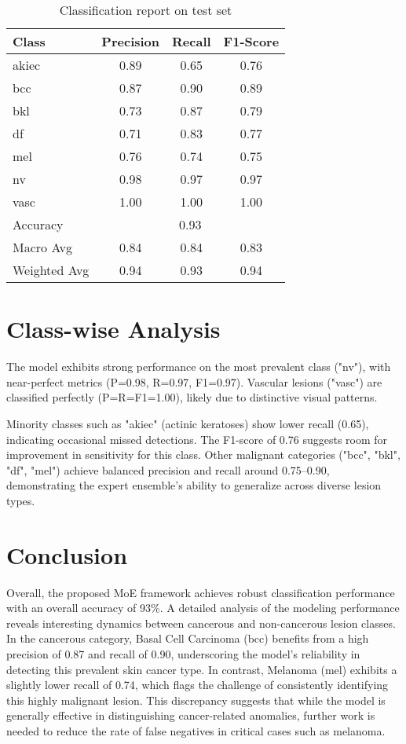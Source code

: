\begin{table}[h!]
  \centering
  \caption{Classification report on test set}
  \label{tab:classification-report}
  \begin{tabular}{lccc}
    \hline
    Class & Precision & Recall & F1-Score \\
    \hline
    akiec  & 0.89 & 0.65 & 0.76 \\
    bcc    & 0.87 & 0.90 & 0.89 \\
    bkl    & 0.73 & 0.87 & 0.79 \\
    df     & 0.71 & 0.83 & 0.77 \\
    mel    & 0.76 & 0.74 & 0.75 \\
    nv     & 0.98 & 0.97 & 0.97 \\
    vasc   & 1.00 & 1.00 & 1.00 \\
    \hline
    Accuracy      & \multicolumn{3}{c}{0.93} \\
    Macro Avg     & 0.84 & 0.84 & 0.83 \\
    Weighted Avg  & 0.94 & 0.93 & 0.94 \\
    \hline
  \end{tabular}
\end{table}



\section{Class-wise Analysis}
The model exhibits strong performance on the most prevalent class ("nv"), with near-perfect metrics (P=0.98, R=0.97, F1=0.97). Vascular lesions ("vasc") are classified perfectly (P=R=F1=1.00), likely due to distinctive visual patterns.

Minority classes such as "akiec" (actinic keratoses) show lower recall (0.65), indicating occasional missed detections. The F1-score of 0.76 suggests room for improvement in sensitivity for this class. Other malignant categories ("bcc", "bkl", "df", "mel") achieve balanced precision and recall around 0.75--0.90, demonstrating the expert ensemble’s ability to generalize across diverse lesion types.
\section{Conclusion}
Overall, the proposed MoE framework achieves robust classification performance with an overall accuracy of 93\%. A detailed analysis of the modeling performance reveals interesting dynamics between cancerous and non-cancerous lesion classes. In the cancerous category, Basal Cell Carcinoma (bcc) benefits from a high precision of 0.87 and recall of 0.90, underscoring the model's reliability in detecting this prevalent skin cancer type. In contrast, Melanoma (mel) exhibits a slightly lower recall of 0.74, which flags the challenge of consistently identifying this highly malignant lesion. This discrepancy suggests that while the model is generally effective in distinguishing cancer-related anomalies, further work is needed to reduce the rate of false negatives in critical cases such as melanoma.

